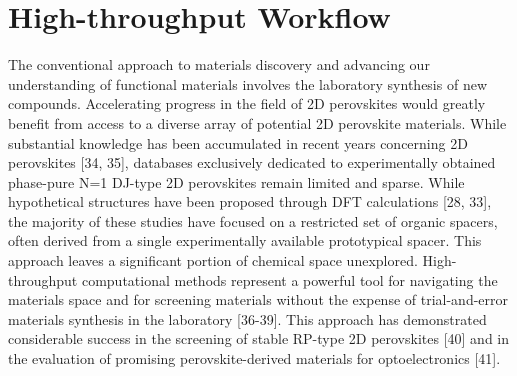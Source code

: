 \section{High-throughput Workflow}

The conventional approach to materials discovery and advancing our understanding of functional materials involves the laboratory synthesis of new compounds. Accelerating progress in the field of 2D perovskites would greatly benefit from access to a diverse array of potential 2D perovskite materials. While substantial knowledge has been accumulated in recent years concerning 2D perovskites [34, 35], databases exclusively dedicated to experimentally obtained phase-pure N=1 DJ-type 2D perovskites remain limited and sparse. While hypothetical structures have been proposed through DFT calculations [28, 33], the majority of these studies have focused on a restricted set of organic spacers, often derived from a single experimentally available prototypical spacer. This approach leaves a significant portion of chemical space unexplored. High-throughput computational methods represent a powerful tool for navigating the materials space and for screening materials without the expense of trial-and-error materials synthesis in the laboratory [36-39]. This approach has demonstrated considerable success in the screening of stable RP-type 2D perovskites [40] and in the evaluation of promising perovskite-derived materials for optoelectronics [41]. 

